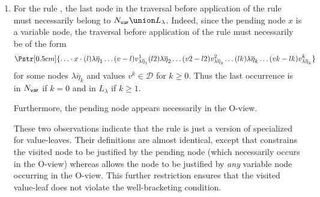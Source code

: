 \begin{remark}
\begin{enumerate}
    \item For the rule , the last node in the traversal before application of the rule must necessarily belong to $N_{\sf var} \union L_\lambda$. Indeed, since the pending node $x$ is a variable node, the traversal before application of the rule must necessarily be of the form
$$\Pstr[0.5cm]{\ldots \cdot x \cdot  (l){\lambda \overline{\eta}_1}\ldots (v-l){v^1_{\lambda \overline{\eta}_1}}
(l2){\lambda \overline{\eta}_2}\ldots (v2-l2){v^2_{\lambda \overline{\eta}_2}}
\ldots (lk){\lambda \overline{\eta}_k}\ldots (vk-lk){v^k_{\lambda \overline{\eta}_k}}
}$$ for some nodes $\lambda \overline{\eta}_k$ and values $v^k \in \mathcal{D}$ for $k\geq 0$.
Thus the last occurrence is in $N_{\sf var}$ if $k=0$ and in $L_\lambda$ if $k\geq1$.

    Furthermore, the pending node appears necessarily in the O-view.

    These two observations indicate that the rule  is just a version of 
    specialized for value-leaves. Their definitions are almost identical,
except that  constrains the visited node
    to be justified by the pending node (which necessarily occurs in the O-view) whereas 
    allows the node to be justified by \emph{any} variable node occurring in the O-view.
    This further restriction ensures that the visited value-leaf does not violate the well-bracketing condition.
\end{enumerate}
\end{remark}
\bigskip

